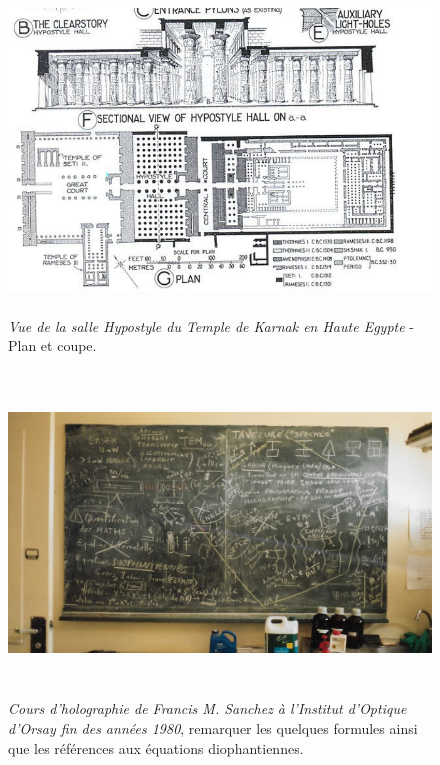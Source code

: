 \documentclass[a4paper,12pt]{article}
\begin{document}
\begin{appendix}
\begin{figure}
\centering
\includegraphics[width=14.5cm,height=8.6cm]{./figures/karnak.png}
\caption [Plan du Temple de Karnak]{\textit{Vue de la salle Hypostyle du Temple de Karnak en Haute Egypte} - Plan et coupe.} 
\label{fig:4:figure4}
\end{figure}

\begin{figure}[h]
\centering
\includegraphics[width=14.5cm,height=8.6cm]{./figures/fs-tab.png}
\caption [Cours d'holographie à l'Institut d'Optique d'Orsay]{\textit{Cours d'holographie de Francis M. Sanchez à l'Institut d'Optique d'Orsay fin des années 1980}, remarquer les quelques formules ainsi que les références aux équations diophantiennes.} 
\label{fig:3:figure3}
\end{figure}

  



\end{appendix}
\end{document}
